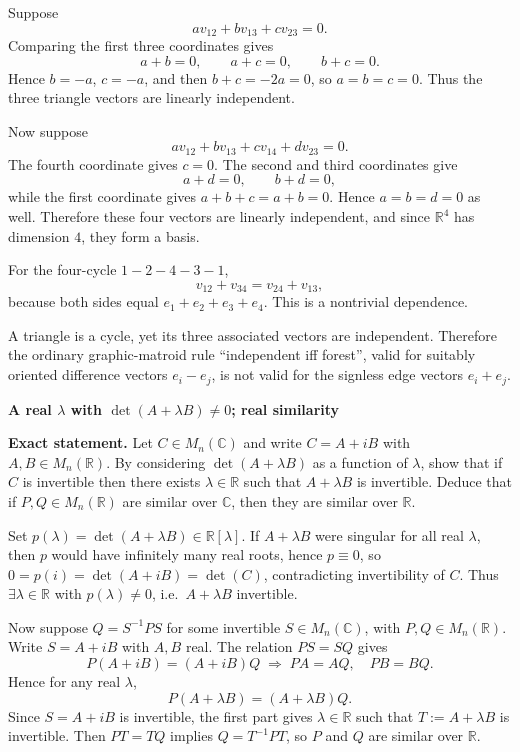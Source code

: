 \begin{solution}
Suppose
\[
a v_{12}+b v_{13}+c v_{23}=0.
\]
Comparing the first three coordinates gives
\[
a+b=0,\qquad a+c=0,\qquad b+c=0.
\]
Hence \(b=-a\), \(c=-a\), and then \(b+c=-2a=0\), so \(a=b=c=0\).
Thus the three triangle vectors are linearly independent.

Now suppose
\[
a v_{12}+b v_{13}+c v_{14}+d v_{23}=0.
\]
The fourth coordinate gives \(c=0\). The second and third coordinates give
\[
a+d=0,\qquad b+d=0,
\]
while the first coordinate gives \(a+b+c=a+b=0\). Hence \(a=b=d=0\) as well.
Therefore these four vectors are linearly independent, and since \(\mathbb R^4\) has dimension
\(4\), they form a basis.

For the four-cycle \(1-2-4-3-1\),
\[
v_{12}+v_{34}=v_{24}+v_{13},
\]
because both sides equal \(e_1+e_2+e_3+e_4\). This is a nontrivial dependence.

A triangle is a cycle, yet its three associated vectors are independent. Therefore the ordinary
graphic-matroid rule ``independent iff forest'', valid for suitably oriented difference vectors
\(e_i-e_j\), is not valid for the signless edge vectors \(e_i+e_j\).
\end{solution}

\begin{problem}[CP-I-0060]
\label{prob:cp-i-0060}
\textbf{A real $\lambda$ with $\det(A+\lambda B)\neq 0$; real similarity}

\textbf{Exact statement.}
\hspace*{1.5em}Let $C\in M_n(\mathbb C)$ and write $C=A+iB$ with $A,B\in M_n(\mathbb R)$.
By considering $\det(A+\lambda B)$ as a function of $\lambda$, show that if $C$ is invertible then there exists $\lambda\in\mathbb R$ such that $A+\lambda B$ is invertible.
Deduce that if $P,Q\in M_n(\mathbb R)$ are similar over $\mathbb C$, then they are similar over $\mathbb R$.

\end{problem}

\begin{solution}
Set $p(\lambda)=\det(A+\lambda B)\in\mathbb R[\lambda]$. If $A+\lambda B$ were singular for all real $\lambda$, then $p$ would have infinitely many real roots, hence $p\equiv 0$, so $0=p(i)=\det(A+iB)=\det(C)$, contradicting invertibility of $C$.
Thus $\exists \lambda\in\mathbb R$ with $p(\lambda)\neq 0$, i.e.\ $A+\lambda B$ invertible.

Now suppose $Q=S^{-1}PS$ for some invertible $S\in M_n(\mathbb C)$, with $P,Q\in M_n(\mathbb R)$.
Write $S=A+iB$ with $A,B$ real. The relation $PS=SQ$ gives
\[
P(A+iB)=(A+iB)Q \;\Rightarrow\; PA=AQ,\quad PB=BQ.
\]
Hence for any real $\lambda$,
\[
P(A+\lambda B)=(A+\lambda B)Q.
\]
Since $S=A+iB$ is invertible, the first part gives $\lambda\in\mathbb R$ such that $T:=A+\lambda B$ is invertible.
Then $PT=TQ$ implies $Q=T^{-1}PT$, so $P$ and $Q$ are similar over $\mathbb R$.
\end{solution}

